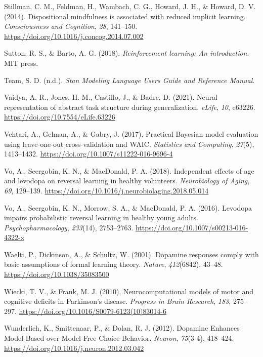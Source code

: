 \documentclass[
  man]{apa6}
\newlength{\cslhangindent}
\newlength{\cslentryspacingunit} %
\newenvironment{CSLReferences}[2] %
 {%
  \setlength{\parindent}{0pt}
  \ifodd #1
  \let\oldpar\par
  \def\par{\hangindent=\cslhangindent\oldpar}
  \fi
  \setlength{\parskip}{#2\cslentryspacingunit}
 }%
 {}
\begin{document}
\begin{CSLReferences}{1}{0}
\leavevmode{}%
Stillman, C. M., Feldman, H., Wambach, C. G., Howard, J. H., \& Howard, D. V. (2014). Dispositional mindfulness is associated with reduced implicit learning. \emph{Consciousness and Cognition}, \emph{28}, 141--150. \url{https://doi.org/10.1016/j.concog.2014.07.002}

\leavevmode{}%
Sutton, R. S., \& Barto, A. G. (2018). \emph{Reinforcement learning: {An} introduction}. {MIT press}.

\leavevmode{}%
Team, S. D. (n.d.). \emph{Stan {Modeling Language Users Guide} and {Reference Manual}}.

\leavevmode{}%
Vaidya, A. R., Jones, H. M., Castillo, J., \& Badre, D. (2021). Neural representation of abstract task structure during generalization. \emph{eLife}, \emph{10}, e63226. \url{https://doi.org/10.7554/eLife.63226}

\leavevmode{}%
Vehtari, A., Gelman, A., \& Gabry, J. (2017). Practical {Bayesian} model evaluation using leave-one-out cross-validation and {WAIC}. \emph{Statistics and Computing}, \emph{27}(5), 1413--1432. \url{https://doi.org/10.1007/s11222-016-9696-4}

\leavevmode{}%
Vo, A., Seergobin, K. N., \& MacDonald, P. A. (2018). Independent effects of age and levodopa on reversal learning in healthy volunteers. \emph{Neurobiology of Aging}, \emph{69}, 129--139. \url{https://doi.org/10.1016/j.neurobiolaging.2018.05.014}

\leavevmode{}%
Vo, A., Seergobin, K. N., Morrow, S. A., \& MacDonald, P. A. (2016). Levodopa impairs probabilistic reversal learning in healthy young adults. \emph{Psychopharmacology}, \emph{233}(14), 2753--2763. \url{https://doi.org/10.1007/s00213-016-4322-x}

\leavevmode{}%
Waelti, P., Dickinson, A., \& Schultz, W. (2001). Dopamine responses comply with basic assumptions of formal learning theory. \emph{Nature}, \emph{412}(6842), 43--48. \url{https://doi.org/10.1038/35083500}

\leavevmode{}%
Wiecki, T. V., \& Frank, M. J. (2010). Neurocomputational models of motor and cognitive deficits in {Parkinson}'s disease. \emph{Progress in Brain Research}, \emph{183}, 275--297. \url{https://doi.org/10.1016/S0079-6123(10)83014-6}

\leavevmode{}%
Wunderlich, K., Smittenaar, P., \& Dolan, R. J. (2012). Dopamine {Enhances Model-Based} over {Model-Free Choice Behavior}. \emph{Neuron}, \emph{75}(3-4), 418--424. \url{https://doi.org/10.1016/j.neuron.2012.03.042}

\end{CSLReferences}
\end{document}
